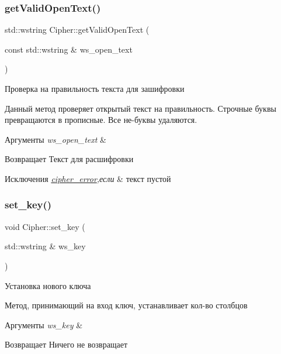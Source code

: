\subsubsection{\texorpdfstring{get\+Valid\+Open\+Text()}{getValidOpenText()}}
{\footnotesize\ttfamily std\+::wstring Cipher\+::get\+Valid\+Open\+Text (\begin{DoxyParamCaption}\item[{const std\+::wstring \&}]{ws\+\_\+open\+\_\+text }\end{DoxyParamCaption})\hspace{0.3cm}{\ttfamily [inline]}}



Проверка на правильность текста для зашифровки 

Данный метод проверяет открытый текст на правильность. Строчные буквы превращаются в прописные. Все не-\/буквы удаляются.


\begin{DoxyParams}{Аргументы}
{\em ws\+\_\+open\+\_\+text} & \\
\hline
\end{DoxyParams}
\begin{DoxyReturn}{Возвращает}
Текст для расшифровки 
\end{DoxyReturn}

\begin{DoxyExceptions}{Исключения}
{\em \hyperlink{classcipher__error}{cipher\+\_\+error},если} & текст пустой \\
\hline
\end{DoxyExceptions}
\mbox{\label{classCipher_a86145f7c206e6d75852a28ffe29dc47a}} 
\subsubsection{\texorpdfstring{set\+\_\+key()}{set\_key()}}
{\footnotesize\ttfamily void Cipher\+::set\+\_\+key (\begin{DoxyParamCaption}\item[{std\+::wstring \&}]{ws\+\_\+key }\end{DoxyParamCaption})}



Установка нового ключа 

Метод, принимающий на вход ключ, устанавливает кол-\/во столбцов


\begin{DoxyParams}{Аргументы}
{\em ws\+\_\+key} & \\
\hline
\end{DoxyParams}
\begin{DoxyReturn}{Возвращает}
Ничего не возвращает 
\end{DoxyReturn}
\mbox{\label{classCipher_ae40ca9f1c13890b6d734aa9228d0de28}} 
